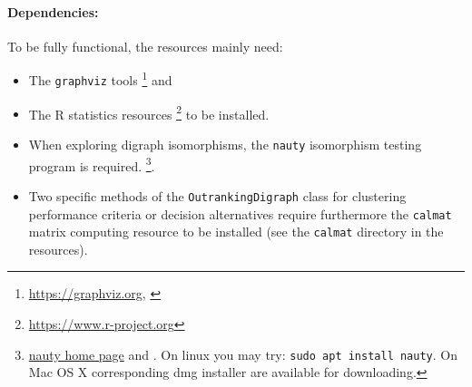 \paragraph{Dependencies:}
To be fully functional, the \Digraph resources mainly need:
\begin{itemize}[leftmargin=0.5cm,listparindent=0em]
\item The \texttt{graphviz} tools \footnote{\href{https://graphviz.org}{https://graphviz.org}, \citet{graphViz}} and 
\item The R statistics resources \footnote{\href{https://www.r-project.org}{https://www.r-project.org}} to be installed.
\item When exploring digraph isomorphisms, the \texttt{nauty} isomorphism testing program is required. \footnote{\href{https://www.cs.sunysb.edu/~algorith/implement/nauty/implement.shtml}{nauty home page} and \citet{nauty}. On linux you may try: \texttt{sudo apt install nauty}. On Mac OS X corresponding dmg installer are available for downloading.}.
\item Two specific methods of the \texttt{OutrankingDigraph} class for clustering performance criteria or decision alternatives require furthermore the \texttt{calmat} matrix computing resource to be installed (see the \texttt{calmat} directory in the \Digraph resources).
\end{itemize}

